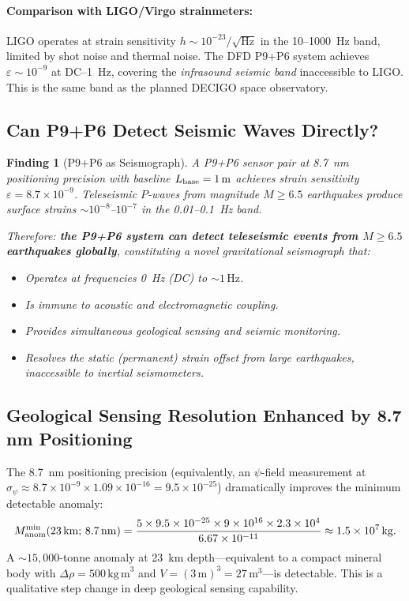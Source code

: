 \documentclass[aps,prd,twocolumn,superscriptaddress,nofootinbib]{revtex4-2}
\newcommand{\drho}{\Delta\rho}
\newcommand{\km}{\,\mathrm{km}}
\newtheorem{finding}{Finding}
\begin{document}
\paragraph{Comparison with LIGO/Virgo strainmeters:}
LIGO operates at strain sensitivity $h \sim 10^{-23}/\sqrt{\mathrm{Hz}}$
in the 10--1000~Hz band, limited by shot noise and thermal noise.
The DFD P9+P6 system achieves $\varepsilon \sim 10^{-9}$ at DC--1~Hz,
covering the \emph{infrasound seismic band} inaccessible to LIGO.
This is the same band as the planned DECIGO space observatory.

\subsection{Can P9+P6 Detect Seismic Waves Directly?}

\begin{finding}[P9+P6 as Seismograph]
\label{find:seismograph}
A P9+P6 sensor pair at 8.7~nm positioning precision with baseline
$L_{\rm base} = 1\,\mathrm{m}$ achieves strain sensitivity
$\varepsilon = 8.7\times10^{-9}$.  Teleseismic $P$-waves from
magnitude $M \geq 6.5$ earthquakes produce surface strains
$\sim 10^{-8}$--$10^{-7}$ in the 0.01--0.1~Hz band.

Therefore: \textbf{the P9+P6 system can detect teleseismic events
from $M \geq 6.5$ earthquakes globally}, constituting a novel
gravitational seismograph that:
\begin{itemize}
\item Operates at frequencies 0~Hz (DC) to $\sim 1\,\mathrm{Hz}$.
\item Is immune to acoustic and electromagnetic coupling.
\item Provides simultaneous geological sensing and seismic monitoring.
\item Resolves the static (permanent) strain offset from large
  earthquakes, inaccessible to inertial seismometers.
\end{itemize}
\end{finding}

\subsection{Geological Sensing Resolution Enhanced by 8.7 nm Positioning}

The 8.7~nm positioning precision (equivalently, an $\psi$-field
measurement at $\sigma_\psi \approx 8.7\times10^{-9}\times1.09\times10^{-16}
= 9.5\times10^{-25}$) dramatically improves the minimum detectable
anomaly:
\begin{equation}
  M_{\rm anom}^{\min}(23\km;\,8.7\,\mathrm{nm})
  = \frac{5\times9.5\times10^{-25}\times9\times10^{16}\times2.3\times10^4}
  {6.67\times10^{-11}}
  \approx 1.5\times10^7\,\mathrm{kg}.
  \label{eq:min-mass-87nm}
\end{equation}
A $\sim 15,000$-tonne anomaly at 23~km depth---equivalent to a
compact mineral body with $\drho = 500\,\mathrm{kg\,m}^3$ and
$V = (3\,\mathrm{m})^3 = 27\,\mathrm{m}^3$---is detectable.
This is a qualitative step change in deep geological sensing capability.
\end{document}
